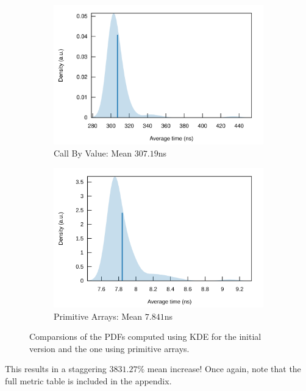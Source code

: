 \begin{figure}[H]
\centering
\begin{subfigure}{.5\textwidth}
  \centering
  \includegraphics[width=\linewidth]{./assets/callbyvaluepdf}
  \caption{Call By Value: Mean $307.19$ns}
\end{subfigure}%
\begin{subfigure}{.5\textwidth}
  \centering
  \includegraphics[width=\linewidth]{./assets/arrayspdf}
  \caption{Primitive Arrays: Mean $7.841$ns}
\end{subfigure}
  \caption{Comparsions of the \acp{PDF} computed using \ac{KDE} for the initial version and the one using primitive arrays.}
\end{figure}

This results in a staggering $3831.27\%$ mean increase! Once again, note that the full metric table is included in the appendix.\\

